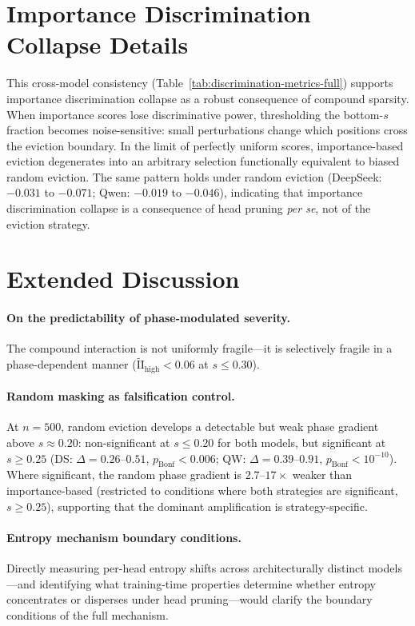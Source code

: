 \section{Importance Discrimination Collapse Details}
\label{app:discrimination-collapse-details}

This cross-model consistency (Table~\ref{tab:discrimination-metrics-full}) supports importance discrimination collapse as a robust consequence of compound sparsity. When importance scores lose discriminative power, thresholding the bottom-$s$ fraction becomes noise-sensitive: small perturbations change which positions cross the eviction boundary. In the limit of perfectly uniform scores, importance-based eviction degenerates into an arbitrary selection functionally equivalent to biased random eviction. The same pattern holds under random eviction (DeepSeek: $-0.031$ to $-0.071$; Qwen: $-0.019$ to $-0.046$), indicating that importance discrimination collapse is a consequence of head pruning \emph{per se}, not of the eviction strategy.


\section{Extended Discussion}
\label{app:extended-discussion}

\paragraph{On the predictability of phase-modulated severity.}
The compound interaction is not uniformly fragile---it is selectively fragile in a phase-dependent manner ($\widetilde{\mathrm{II}}_{\text{high}} < 0.06$ at $s \leq 0.30$).

\paragraph{Random masking as falsification control.}
At $n{=}500$, random eviction develops a detectable but weak phase gradient above $s \approx 0.20$: non-significant at $s \leq 0.20$ for both models, but significant at $s \geq 0.25$ (DS: $\Delta{=}0.26$--$0.51$, $p_{\text{Bonf}} < 0.006$; QW: $\Delta{=}0.39$--$0.91$, $p_{\text{Bonf}} < 10^{-10}$). Where significant, the random phase gradient is $2.7$--$17{\times}$ weaker than importance-based (restricted to conditions where both strategies are significant, $s \geq 0.25$), supporting that the dominant amplification is strategy-specific.

\paragraph{Entropy mechanism boundary conditions.}
Directly measuring per-head entropy shifts across architecturally distinct models---and identifying what training-time properties determine whether entropy concentrates or disperses under head pruning---would clarify the boundary conditions of the full mechanism.


